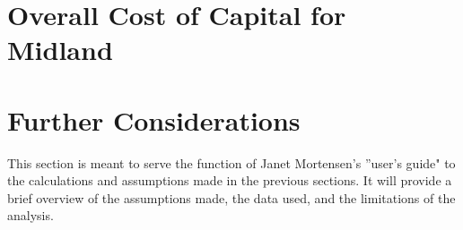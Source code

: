 \documentclass{article}
\begin{document}
\section{Overall Cost of Capital for Midland}

\hrulefill
\section{Further Considerations}
This section is meant to serve the function of Janet Mortensen's ''user's guide" to the calculations and assumptions made in the previous sections. It will provide a brief overview of the assumptions made, the data used, and the limitations of the analysis.
\end{document}
